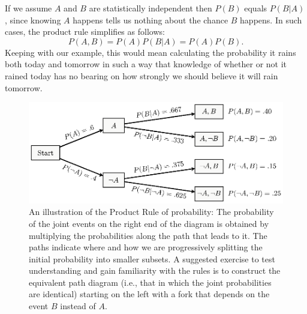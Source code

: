 {If we assume $A$ and $B$ are statistically independent then $P(B)$ equals $P(B|A)$, since knowing $A$ happens tells us nothing about the chance $B$ happens.}  {In such cases, the product} rule simplifies as follows:
\begin{equation}
P(A,B) = P(A)P(B|A) = P(A)P(B).
\label{eq:indep}
\end{equation}
Keeping with our example, this would mean calculating the probability it rains both today and tomorrow in such a way that knowledge of whether or not it rained today has no bearing on how strongly we should believe it will rain tomorrow.

\begin{figure}[tb]
\begin{center}
\includegraphics[scale=1.2,viewport=65 170 415 290,bb=65 170 415 290]{figs/bi0_etzvandekerckhove_fig1}
\end{center}
\caption{An illustration of the Product Rule of probability: The probability of the joint events on the right end of the diagram is obtained by multiplying the probabilities along the path that leads to it. The paths indicate where and how we are progressively splitting the initial probability into smaller subsets.  A suggested exercise to test understanding and gain familiarity with the rules is to construct the equivalent path diagram (i.e., that in which the joint probabilities are identical) starting on the left with a fork that depends on the event $B$ instead of $A$.}
\label{fig:bi0:path}
\end{figure}

